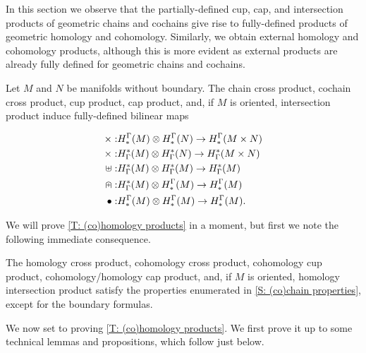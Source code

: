 In this section we observe that the partially-defined cup, cap, and intersection products of geometric chains and cochains give rise to fully-defined products of geometric homology and cohomology. Similarly, we obtain external homology and cohomology products, although this is more evident as external products are already fully defined for geometric chains and cochains.

\begin{theorem}\label{T: (co)homology products}
Let $M$ and $N$ be manifolds without boundary. The chain cross product, cochain cross product, cup product, cap product, and, if $M$ is oriented, intersection product induce fully-defined bilinear maps

\begin{align*}
\times:& H^\Gamma_*(M) \otimes H^\Gamma_*(N) \to H^\Gamma_*(M \times N)\\
\times:& H_\Gamma^*(M) \otimes H_\Gamma^*(N) \to H_\Gamma^*(M \times N)\\
\uplus:& H_\Gamma^*(M) \otimes H_\Gamma^*(M) \to H_\Gamma^*(M)\\
\nplus:& H_\Gamma^*(M) \otimes H^\Gamma_*(M) \to H^\Gamma_*(M)\\
\bullet:& H^\Gamma_*(M) \otimes H^\Gamma_*(M) \to H^\Gamma_*(M).\\
\end{align*}
\end{theorem}

We will prove \cref{T: (co)homology products} in a moment, but first we note the following immediate consequence.
\begin{theorem}
The homology cross product, cohomology cross product, cohomology cup product, cohomology/homology cap product, and, if $M$ is oriented, homology intersection product satisfy the properties enumerated in \cref{S: (co)chain properties}, except for the boundary formulas.
\end{theorem}

We now set to proving \cref{T: (co)homology products}. We first prove it up to some technical lemmas and propositions, which follow just below.

